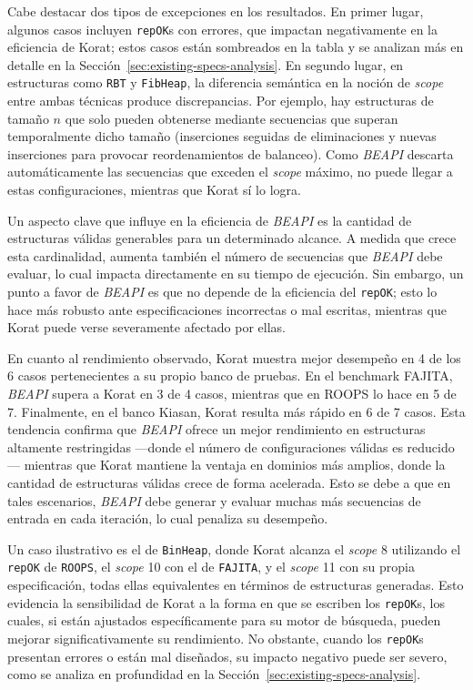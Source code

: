 Cabe destacar dos tipos de excepciones en los resultados. En primer lugar, algunos casos incluyen 
\texttt{repOK}s con errores, que impactan negativamente en la eficiencia de \textsf{Korat}; estos 
casos están sombreados en la tabla y se analizan más en detalle en la Sección~\ref{sec:existing-specs-analysis}. 
En segundo lugar, en estructuras como \texttt{RBT} y \texttt{FibHeap}, la diferencia semántica en la 
noción de \emph{scope} entre ambas técnicas produce discrepancias. Por ejemplo, hay estructuras de 
tamaño $n$ que solo pueden obtenerse mediante secuencias que superan temporalmente dicho tamaño 
(inserciones seguidas de eliminaciones y nuevas inserciones para provocar reordenamientos de balanceo). 
Como \emph{BEAPI} descarta automáticamente las secuencias que exceden el \emph{scope} máximo, no puede 
llegar a estas configuraciones, mientras que \textsf{Korat} sí lo logra.

Un aspecto clave que influye en la eficiencia de \emph{BEAPI} es la cantidad de estructuras válidas 
generables para un determinado alcance. A medida que crece esta cardinalidad, aumenta también el 
número de secuencias que \emph{BEAPI} debe evaluar, lo cual impacta directamente en su tiempo de 
ejecución. Sin embargo, un punto a favor de \emph{BEAPI} es que no depende de la eficiencia del 
\texttt{repOK}; esto lo hace más robusto ante especificaciones incorrectas o mal escritas, mientras 
que \textsf{Korat} puede verse severamente afectado por ellas.

En cuanto al rendimiento observado, \textsf{Korat} muestra mejor desempeño en 4 de los 6 casos 
pertenecientes a su propio banco de pruebas. En el benchmark \textsf{FAJITA}, \emph{BEAPI} supera 
a \textsf{Korat} en 3 de 4 casos, mientras que en \textsf{ROOPS} lo hace en 5 de 7. Finalmente, 
en el banco \textsf{Kiasan}, \textsf{Korat} resulta más rápido en 6 de 7 casos. Esta tendencia confirma 
que \emph{BEAPI} ofrece un mejor rendimiento en estructuras altamente restringidas —donde el número 
de configuraciones válidas es reducido— mientras que \textsf{Korat} mantiene la ventaja en dominios 
más amplios, donde la cantidad de estructuras válidas crece de forma acelerada. Esto se debe a que 
en tales escenarios, \emph{BEAPI} debe generar y evaluar muchas más secuencias de entrada en cada 
iteración, lo cual penaliza su desempeño.

Un caso ilustrativo es el de \texttt{BinHeap}, donde \textsf{Korat} alcanza el \emph{scope} 8 utilizando 
el \texttt{repOK} de \texttt{ROOPS}, el \emph{scope} 10 con el de \texttt{FAJITA}, y el \emph{scope} 11 
con su propia especificación, todas ellas equivalentes en términos de estructuras generadas. Esto evidencia 
la sensibilidad de \textsf{Korat} a la forma en que se escriben los \texttt{repOK}s, los cuales, si están 
ajustados específicamente para su motor de búsqueda, pueden mejorar significativamente su rendimiento. 
No obstante, cuando los \texttt{repOK}s presentan errores o están mal diseñados, su impacto negativo 
puede ser severo, como se analiza en profundidad en la Sección~\ref{sec:existing-specs-analysis}.

